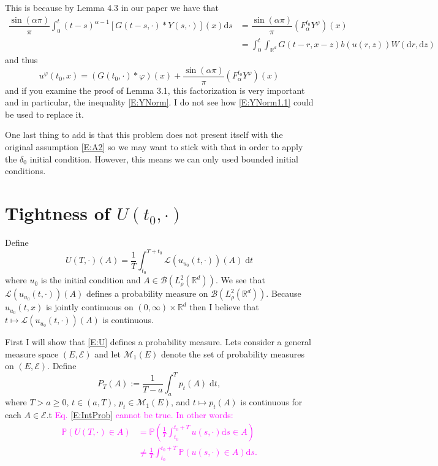 \documentclass{article}
\numberwithin{equation}{section}
\newcommand{\R}{\mathbb{R}}
\newcommand{\ud}{\ensuremath{\mathrm{d}}}
\begin{document}
This is because by Lemma 4.3 in our paper we have that
	\begin{align*}
		\dfrac{\sin(\alpha \pi)}{\pi}\int_0^t(t-s)^{\alpha-1}\left[G(t-s,\cdot)*Y(s,\cdot)\right](x) \ud s &=	\dfrac{\sin(\alpha \pi)}{\pi}\left(F_{\alpha}^{t_0}Y^{\varphi}\right)(x)
		\\&= \int_0^t  \int_{\R^d} G(t-r,x-z)b(u(r,z)) W(\ud r,\ud z)
	\end{align*}
and thus
	\[
		u^\varphi(t_0,x) = (G(t_0,\cdot) * \varphi)(x) + \dfrac{\sin(\alpha \pi)}{\pi}\left(F_{\alpha}^{t_0}Y^{\varphi}\right)(x)
	\]
and if you examine the proof of Lemma 3.1, this factorization is very important and in particular, the inequality \eqref{E:YNorm}. I do not see how \eqref{E:YNorm1.1} could be used to replace it.

One last thing to add is that this problem does not present itself with the original assumption \eqref{E:A2} so we may want to stick with that in order to apply the $\delta_0$ initial condition. However, this means we can only used bounded initial conditions.

\section{Tightness of $U(t_0,\cdot)$}
Define
	\begin{equation}
	\label{E:U}
		U(T,\cdot)(A) = \frac{1}{T} \int_{t_0}^{T + t_0} \mathscr{L}(u_{u_0}(t,\cdot))(A) \; \ud t
	\end{equation}
where $u_0$ is the initial condition and $A \in \mathscr{B}(L^2_{\rho}(\R^d))$. We see that $\mathscr{L}(u_{u_0}(t,\cdot))(A)$ defines a probability measure on $\mathscr{B}(L^2_{\rho}(\R^d))$. Because $u_{u_0}(t,x)$ is jointly continuous on $(0,\infty) \times \R^d$ then I believe that $t \mapsto \mathscr{L}(u_{u_0}(t,\cdot))(A)$ is continuous.

First I will show that \eqref{E:U} defines a probability measure. Lets consider a general measure space $(E, \mathscr{E})$ and let $\mathcal{M}_1(E)$ denote the set of probability measures on $(E, \mathscr{E})$. Define
	\begin{equation}
		\label{E:IntProb}
		P_T(A) := \frac{1}{T-a} \int_a^T p_t(A) \; \ud t,
	\end{equation}
where $T>a \ge 0$, $t \in (a,T)$, $p_t \in \mathcal{M}_1(E)$, and  $t \mapsto p_t(A)$ is continuous for each $A \in \mathscr{E}$.t
\bigskip
\textcolor{magenta}{Eq. \eqref{E:IntProb} cannot be true. In other words:
\begin{align*}
  \mathbb{P}\left(U(T,\cdot) \in A \right)
  & = \mathbb{P}\left(\frac{1}{T}\int_{t_0}^{t_0+T} u(s,\cdot) \ud s \in A\right)\\
  & \ne \frac{1}{T}\int_{t_0}^{t_0+T} \mathbb{P}\left( u(s,\cdot) \in A\right)
  \ud s.
\end{align*}}
\end{document}
